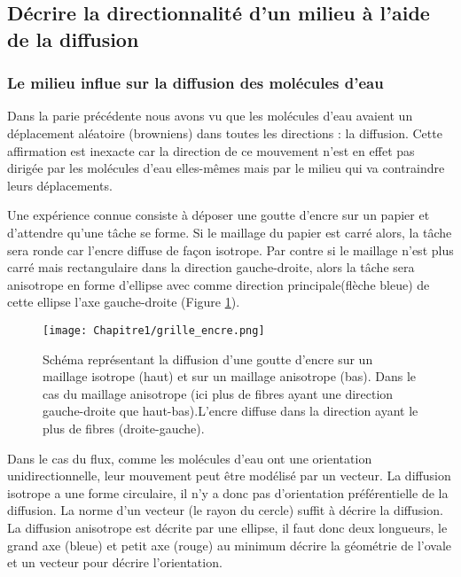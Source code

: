  \subsection{Décrire la directionnalité d’un milieu à l’aide de la diffusion}

\subsubsection{Le milieu influe sur la diffusion des molécules d’eau}

Dans la parie précédente nous avons vu que les molécules d’eau avaient un déplacement aléatoire (browniens) dans toutes les directions : la diffusion. Cette affirmation est inexacte car la direction de ce mouvement n’est en effet pas dirigée par les molécules d’eau elles-mêmes mais par le milieu qui va contraindre leurs déplacements.

Une expérience connue consiste à déposer une goutte d’encre sur un papier et d’attendre qu’une tâche se forme. Si le maillage du papier est carré alors, la tâche sera ronde car l’encre diffuse de façon isotrope. Par contre si le maillage n’est plus carré mais rectangulaire dans la direction gauche-droite, alors la tâche sera anisotrope en forme d’ellipse avec comme direction principale(flèche bleue) de cette ellipse l’axe gauche-droite (Figure \ref{fig:grille_encre}).

\begin{figure}[!htbp]
  \begin{center}
    \texttt{[image: Chapitre1/grille\_encre.png]}
     \end{center}
    \caption{ Schéma représentant la diffusion d’une goutte d’encre sur un maillage isotrope (haut) et sur un maillage anisotrope (bas). Dans le cas du maillage anisotrope (ici plus de fibres ayant une direction gauche-droite que haut-bas).L’encre diffuse dans la direction ayant le plus de fibres (droite-gauche).}
  \label{fig:grille_encre}
\end{figure}
Dans le cas du flux, comme les molécules d’eau ont une orientation unidirectionnelle, leur mouvement peut être modélisé par un vecteur.
La diffusion isotrope a une forme circulaire, il n’y a donc pas d’orientation préférentielle de la diffusion. La norme d’un vecteur (le rayon du cercle) suffit à décrire la diffusion.
La diffusion anisotrope est décrite par une ellipse, il faut donc deux longueurs, le grand axe (bleue) et petit axe (rouge) au minimum décrire la géométrie de l’ovale et un vecteur pour décrire l’orientation.

